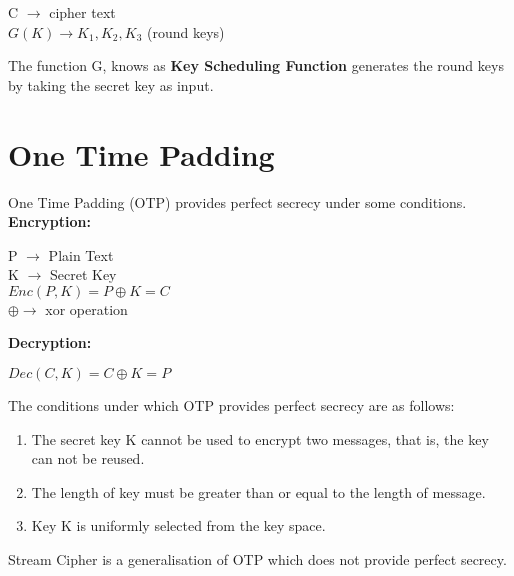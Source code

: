 \documentclass[11pt]{article}
\begin{document}
\begin{center}
    C $\rightarrow$ cipher text\\
    $G(K) \rightarrow K_1, K_2, K_3$ (round keys)\\ 
\end{center}
The function G, knows as \textbf{Key Scheduling Function} generates the round keys by taking the secret key as input.

\section{One Time Padding}
One Time Padding (OTP) provides perfect secrecy under some conditions.\\
\newline
\textbf{Encryption: }
\begin{center}
    P $\rightarrow$ Plain Text\\
    K $\rightarrow$ Secret Key\\
    $Enc(P, K) = P \oplus K = C$\\
    $\oplus \rightarrow $ xor operation\\
\end{center}
\textbf{Decryption: }
\begin{center}
    $Dec(C, K) = C \oplus K = P$\\
\end{center}
The conditions under which OTP provides perfect secrecy are as follows:
\begin{enumerate}
    \item The secret key K cannot be used to encrypt two messages, that is, the key can not be reused.
    \item The length of key must be greater than or equal to the length of message.
    \item Key K is uniformly selected from the key space.
\end{enumerate}
Stream Cipher is a generalisation of OTP which does not provide perfect secrecy.
\end{document}
